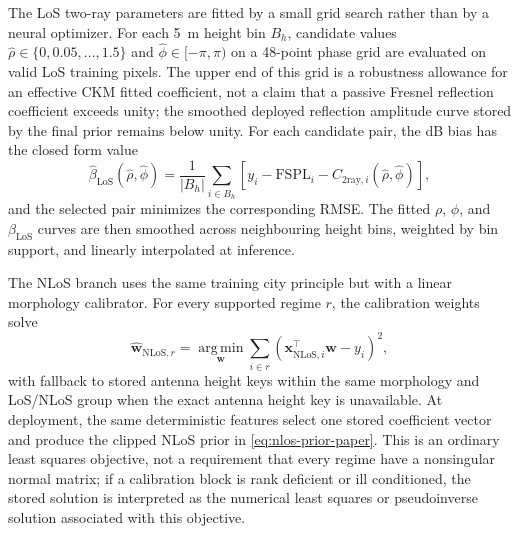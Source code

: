 \documentclass[journal]{IEEEtran}
\begin{document}
The LoS two-ray parameters are fitted by a small grid search rather than by a
neural optimizer. For each \SI{5}{m} height bin \(B_h\), candidate values
\(\hat\rho\in\{0,0.05,\ldots,1.5\}\) and
\(\hat\phi\in[-\pi,\pi)\) on a 48-point phase grid are evaluated on valid LoS
training pixels. The upper end of this grid is a robustness allowance for an
effective CKM fitted coefficient, not a claim that a passive Fresnel reflection
coefficient exceeds unity; the smoothed deployed reflection amplitude curve
stored by the final prior remains below unity. For each candidate pair, the dB bias has the closed form value
\begin{equation}
\hat\beta_{\mathrm{LoS}}(\hat\rho,\hat\phi)
=\frac{1}{|B_h|}\sum_{i\in B_h}
\left[y_i-\mathrm{FSPL}_i-C_{\mathrm{2ray},i}(\hat\rho,\hat\phi)\right],
\label{eq:los-bias-fit}
\end{equation}
and the selected pair minimizes the corresponding RMSE. The fitted
\(\rho\), \(\phi\), and \(\beta_{\mathrm{LoS}}\) curves are then smoothed across neighbouring
height bins, weighted by bin support, and linearly interpolated at inference.

The NLoS branch uses the same training city principle but with a linear morphology
calibrator. For every supported regime \(r\), the calibration weights solve
\begin{equation}
\hat{\mathbf{w}}_{\mathrm{NLoS},r}
=
\operatorname*{arg\,min}_{\mathbf{w}}
\sum_{i\in r}
\left(\mathbf{x}_{\mathrm{NLoS},i}^{\top}\mathbf{w}-y_i\right)^2,
\label{eq:nlos-ols-fit}
\end{equation}
with fallback to stored antenna height keys within the same morphology and
LoS/NLoS group when the exact antenna height key is unavailable. At deployment,
the same deterministic features select
one stored coefficient vector and produce the clipped NLoS prior in
\eqref{eq:nlos-prior-paper}. This is an ordinary least squares objective,
not a requirement that every regime have a nonsingular normal matrix; if a
calibration block is rank deficient or ill conditioned, the stored solution is
interpreted as the numerical least squares or pseudoinverse solution associated
with this objective.
\end{document}
